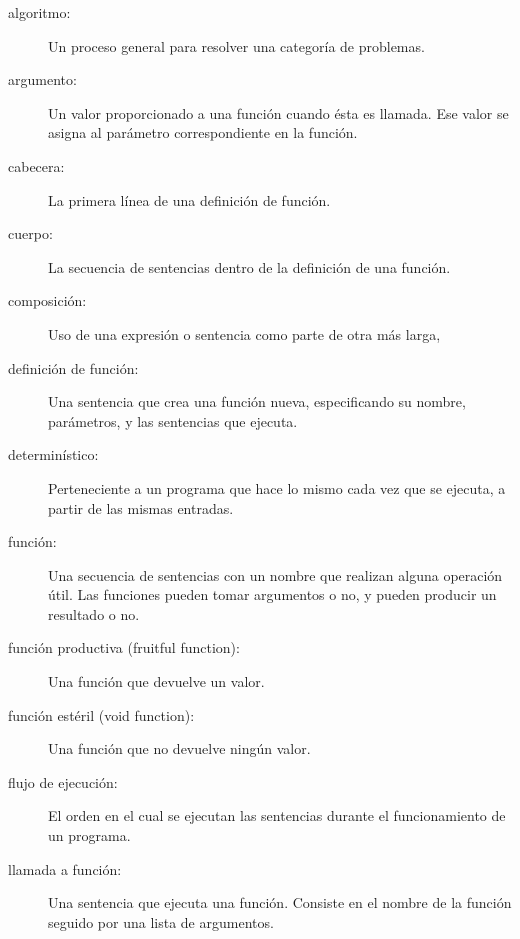 \begin{description}

\item[algoritmo:] Un proceso general para resolver una categoría de problemas.

\item[argumento:] Un valor proporcionado a una función cuando ésta es llamada.
Ese valor se asigna al parámetro correspondiente en la función.

\item[cabecera:] La primera línea de una definición de función.

\item[cuerpo:] La secuencia de sentencias dentro de la definición de una función.

\item[composición:] Uso de una expresión o sentencia como parte de otra más larga,

\item[definición de función:] Una sentencia que crea una función nueva,
especificando su nombre, parámetros, y las sentencias que ejecuta.

\item[determinístico:] Perteneciente a un programa que hace lo mismo
cada vez que se ejecuta, a partir de las mismas entradas.

\item[función:] Una secuencia de sentencias con un nombre que realizan alguna
operación útil. Las funciones pueden tomar argumentos o no, y pueden
producir un resultado o no.

\item[función productiva (fruitful function):] Una función que devuelve un valor.

\item[función estéril (void function):] Una función que no devuelve ningún valor.

\item[flujo de ejecución:] El orden en el cual se ejecutan las sentencias durante
el funcionamiento de un programa.

\item[llamada a función:] Una sentencia que ejecuta una función. Consiste en
el nombre de la función seguido por una lista de argumentos.


\end{description}

